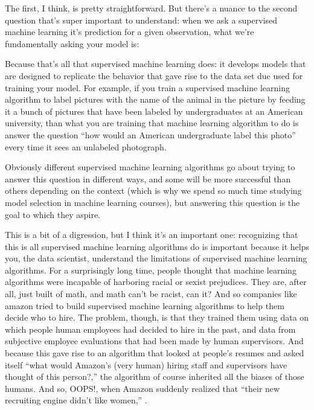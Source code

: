 \documentclass[letterpaper,10pt,english]{jupyterBook}
\begin{document}
\sphinxAtStartPar
The first, I think, is pretty straightforward. But there’s a nuance to the second question that’s super important to understand: when we ask a supervised machine learning it’s prediction for a given observation, what we’re fundamentally asking your model is: 

\sphinxAtStartPar
Because that’s all that supervised machine learning does: it develops models that are designed to replicate the behavior that gave rise to the data set due used for training your model. For example, if you train a supervised machine learning algorithm to label pictures with the name of the animal in the picture by feeding it a bunch of pictures that have been labeled by undergraduates at an American university, than what you are training that machine learning algorithm to do is answer the question “how would an American undergraduate label this photo” every time it sees an unlabeled photograph.

\sphinxAtStartPar
Obviously different supervised machine learning algorithms go about trying to answer this question in different ways, and some will be more successful than others depending on the context (which is why we spend so much time studying model selection in machine learning courses), but answering this question is  the goal to which they aspire.

\sphinxAtStartPar
This is a bit of a digression, but I think it’s an important one: recognizing that this is all supervised machine learning algorithms do is important because it helps you, the data scientist, understand the limitations of supervised machine learning algorithms. For a surprisingly long time, people thought that machine learning algorithms were incapable of harboring racial or sexist prejudices. They are, after all, just built of math, and math can’t be racist, can it? And so companies like amazon tried to build supervised machine learning algorithms to help them decide who to hire. The problem, though, is that they trained them using data on which people human employees had decided to hire in the past, and data from subjective employee evaluations that had been made by human supervisors. And because this gave rise to an algorithm that looked at people’s resumes and asked itself “what would Amazon’s (very human) hiring staff and supervisors have thought of this person?,” the algorithm of course inherited all the biases of those humans. And so, OOPS!, when Amazon suddenly realized that “their new recruiting engine didn’t like women,” .
\end{document}
